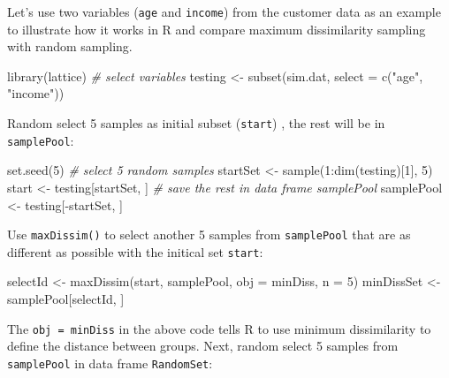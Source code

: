 \documentclass[
  12pt,
]{krantz}
\makeatletter
\newenvironment{Shaded}{\begin{snugshade}}{\end{snugshade}}
\newcommand{\AttributeTok}[1]{\textcolor[rgb]{0.61,0.61,0.61}{#1}}
\newcommand{\CommentTok}[1]{\textcolor[rgb]{0.37,0.37,0.37}{\textit{#1}}}
\newcommand{\DecValTok}[1]{\textcolor[rgb]{0.06,0.06,0.06}{#1}}
\newcommand{\FunctionTok}[1]{\textcolor[rgb]{0,0,0}{#1}}
\newcommand{\NormalTok}[1]{#1}
\newcommand{\OtherTok}[1]{\textcolor[rgb]{0.37,0.37,0.37}{#1}}
\newcommand{\SpecialCharTok}[1]{\textcolor[rgb]{0,0,0}{#1}}
\newcommand{\StringTok}[1]{\textcolor[rgb]{0.5,0.5,0.5}{#1}}
\newenvironment{kframe}{%
\medskip{}
\setlength{\fboxsep}{.8em}
 \def\at@end@of@kframe{}%
 \ifinner\ifhmode%
  \def\at@end@of@kframe{\end{minipage}}%
  \begin{minipage}{\columnwidth}%
 \fi\fi%
 \def\FrameCommand##1{\hskip\@totalleftmargin \hskip-\fboxsep
 \colorbox{shadecolor}{##1}\hskip-\fboxsep
     \hskip-\linewidth \hskip-\@totalleftmargin \hskip\columnwidth}%
 \MakeFramed {\advance\hsize-\width
   \@totalleftmargin\z@ \linewidth\hsize
   \@setminipage}}%
 {\par\unskip\endMakeFramed%
 \at@end@of@kframe}
\renewenvironment{Shaded}{\begin{kframe}}{\end{kframe}}
\makeatother
\begin{document}
Let's use two variables (\texttt{age} and \texttt{income}) from the customer data as an example to illustrate how it works in R and compare maximum dissimilarity sampling with random sampling.

\begin{Shaded}
\begin{Highlighting}[]
\FunctionTok{library}\NormalTok{(lattice)}
\CommentTok{\# select variables}
\NormalTok{testing }\OtherTok{\textless{}{-}} \FunctionTok{subset}\NormalTok{(sim.dat, }\AttributeTok{select =} \FunctionTok{c}\NormalTok{(}\StringTok{"age"}\NormalTok{, }\StringTok{"income"}\NormalTok{))}
\end{Highlighting}
\end{Shaded}

Random select 5 samples as initial subset (\texttt{start}) , the rest will be in \texttt{samplePool}:

\begin{Shaded}
\begin{Highlighting}[]
\FunctionTok{set.seed}\NormalTok{(}\DecValTok{5}\NormalTok{)}
\CommentTok{\# select 5 random samples}
\NormalTok{startSet }\OtherTok{\textless{}{-}} \FunctionTok{sample}\NormalTok{(}\DecValTok{1}\SpecialCharTok{:}\FunctionTok{dim}\NormalTok{(testing)[}\DecValTok{1}\NormalTok{], }\DecValTok{5}\NormalTok{)}
\NormalTok{start }\OtherTok{\textless{}{-}}\NormalTok{ testing[startSet, ]}
\CommentTok{\# save the rest in data frame \textquotesingle{}samplePool\textquotesingle{}}
\NormalTok{samplePool }\OtherTok{\textless{}{-}}\NormalTok{ testing[}\SpecialCharTok{{-}}\NormalTok{startSet, ]}
\end{Highlighting}
\end{Shaded}

Use \texttt{maxDissim()} to select another 5 samples from \texttt{samplePool} that are as different as possible with the initical set \texttt{start}:

\begin{Shaded}
\begin{Highlighting}[]
\NormalTok{selectId }\OtherTok{\textless{}{-}} \FunctionTok{maxDissim}\NormalTok{(start, samplePool, }\AttributeTok{obj =}\NormalTok{ minDiss, }\AttributeTok{n =} \DecValTok{5}\NormalTok{)}
\NormalTok{minDissSet }\OtherTok{\textless{}{-}}\NormalTok{ samplePool[selectId, ]}
\end{Highlighting}
\end{Shaded}

The \texttt{obj\ =\ minDiss} in the above code tells R to use minimum dissimilarity to define the distance between groups. Next, random select 5 samples from \texttt{samplePool} in data frame \texttt{RandomSet}:
\end{document}
